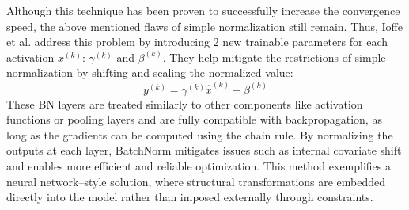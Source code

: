 Although this technique has been proven to successfully increase the convergence speed, the above mentioned flaws of simple normalization still remain. Thus, Ioffe et al. \autocite{ioffe2015batch} address this problem by introducing 2 new trainable parameters for each activation $x^{(k)}$: $\gamma^{(k)}$ and $\beta^{(k)}$. They help mitigate the restrictions of simple normalization by shifting and scaling the normalized value:
\[
  y^{(k)} = \gamma^{(k)} \hat{x}^{(k)} + \beta^{(k)}
\]
These BN layers are treated similarly to other components like activation functions or pooling layers and are fully compatible with backpropagation, as long as the gradients can be computed using the chain rule. By normalizing the outputs at each layer, BatchNorm mitigates issues such as internal covariate shift and enables more efficient and reliable optimization. This method exemplifies a neural network–style solution, where structural transformations are embedded directly into the model rather than imposed externally through constraints.
